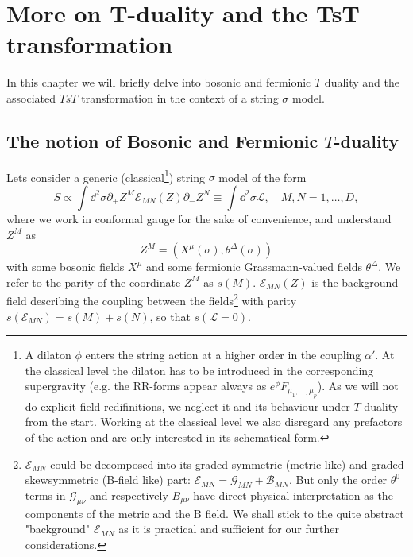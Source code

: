 \chapter{More on T-duality and the TsT transformation}
\adjustmtc
\minitoc
In this chapter  we will briefly delve into bosonic and fermionic $T$ duality
and the associated $TsT$ transformation in the context of a string $\sigma$
model.
\section{The notion of Bosonic and Fermionic $T$-duality}
Lets consider a generic (classical\footnote{A dilaton $\phi$ enters the string
action at a higher order in the coupling $\alpha'$. At the classical level
  the dilaton has to be introduced in the corresponding supergravity (e.g. the
  RR-forms appear always as $e^\phi F_{\mu_1,\dots,\mu_p}$). As we will not do
  explicit field redifinitions, we neglect it and its behaviour under $T$
  duality from the start. Working at the classical level we also disregard any
prefactors of the action and are only interested in its schematical form.})
string $\sigma$ model of the form
\begin{equation}
  S \propto \int\dd^2\sigma\partial_+ Z^M\mathcal{E}_{MN}(Z)\partial_- Z^{N}\equiv
  \int \dd^2\sigma\mathcal{L}, \quad M,N = 1,\dots,D,
\end{equation}
where we work in  conformal gauge for the sake of convenience, and understand
$Z^M$ as
\begin{equation}
  Z^M = (X^\mu(\sigma),\theta^\Delta(\sigma))
\end{equation}
with some bosonic fields $X^\mu$ and some fermionic Grassmann-valued fields
$\theta^\Delta$. We refer to the parity of the  coordinate $Z^M$ as $s(M)$.
$\mathcal{E}_{MN}(Z)$ is the background field describing the coupling between
the fields\footnote{$\mathcal{E}_{MN}$ could be decomposed into its graded
  symmetric (metric like) and graded skewsymmetric (B-field like) part:
  $\mathcal{E}_{MN} = \mathcal{G}_{MN} + \mathcal{B}_{MN}$. But only the order
  $\theta^0$ terms in $\mathcal{G}_{\mu\nu}$ and respectively $B_{\mu\nu}$ have
  direct physical interpretation as the components of the metric and the
  B field. We shall stick to the quite abstract "background" $\mathcal{E}_{MN}$
as it is practical and sufficient for our further considerations.}
with parity $s(\mathcal{E}_{MN}) = s(M) + s(N)$, so that $s(\mathcal{L}=0)$.
